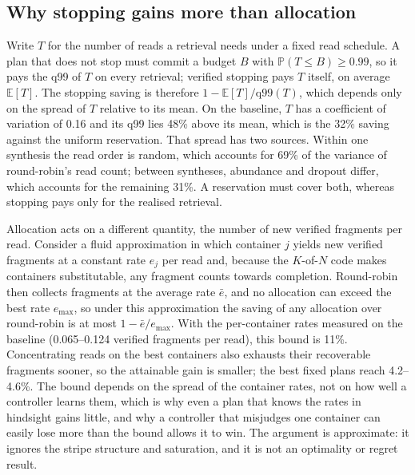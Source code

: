 \documentclass[conference,onecolumn,11pt]{IEEEtran}
\newcommand{\E}{\mathbb{E}}
\newcommand{\Prob}{\mathbb{P}}
\begin{document}
\subsection{Why stopping gains more than allocation}\label{sec:disc-theory}
Write $T$ for the number of reads a retrieval needs under a fixed read schedule.  A plan that does not
stop must commit a budget $B$ with $\Prob(T\le B)\ge0.99$, so it pays the q99 of $T$ on every retrieval;
verified stopping pays $T$ itself, on average $\E[T]$.  The stopping saving is therefore
$1-\E[T]/\mathrm{q99}(T)$, which depends only on the spread of $T$ relative to its mean.  On the baseline,
$T$ has a coefficient of variation of 0.16 and its q99 lies 48\% above its mean, which is
the 32\% saving against the uniform reservation.  That spread has two sources.  Within one synthesis the
read order is random, which accounts for 69\% of the variance of round-robin's read count;
between syntheses, abundance and dropout differ, which accounts for the remaining 31\%.  A
reservation must cover both, whereas stopping pays only for the realised retrieval.

Allocation acts on a different quantity, the number of new verified fragments per read.  Consider a fluid
approximation in which container $j$ yields new verified fragments at a constant rate $e_j$ per read and,
because the $K$-of-$N$ code makes containers substitutable, any fragment counts towards completion.
Round-robin then collects fragments at the average rate $\bar e$, and no allocation can exceed the best
rate $e_{\max}$, so under this approximation the saving of any allocation over round-robin is at most
$1-\bar e/e_{\max}$.  With the per-container rates measured on the baseline (0.065--0.124 verified
fragments per read), this bound is 11\%.  Concentrating reads on the best containers also
exhausts their recoverable fragments sooner, so the attainable gain is smaller; the best fixed plans
reach 4.2--4.6\%.  The bound depends on the spread of the container rates, not on how well a controller
learns them, which is why even a plan that knows the rates in hindsight gains little, and why a
controller that misjudges one container can easily lose more than the bound allows it to win.  The
argument is approximate: it ignores the stripe structure and saturation, and it is not an optimality or
regret result.
\end{document}
